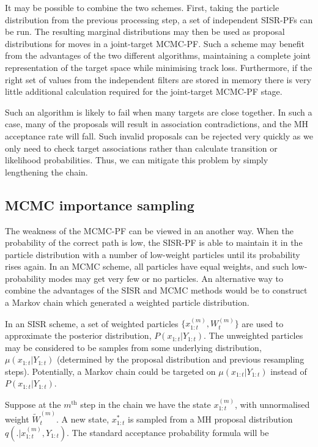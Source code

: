 It may be possible to combine the two schemes. First, taking the particle distribution from the previous processing step, a set of independent SISR-PFs can be run. The resulting marginal distributions may then be used as proposal distributions for moves in a joint-target MCMC-PF. Such a scheme may benefit from the advantages of the two different algorithms, maintaining a complete joint representation of the target space while minimising track loss. Furthermore, if the right set of values from the independent filters are stored in memory there is very little additional calculation required for the joint-target MCMC-PF stage.

Such an algorithm is likely to fail when many targets are close together. In such a case, many of the proposals will result in association contradictions, and the MH acceptance rate will fall. Such invalid proposals can be rejected very quickly as we only need to check target associations rather than calculate transition or likelihood probabilities. Thus, we can mitigate this problem by simply lengthening the chain.



\subsection{MCMC importance sampling}
The weakness of the MCMC-PF can be viewed in an another way. When the probability of the correct path is low, the SISR-PF is able to maintain it in the particle distribution with a number of low-weight particles until its probability rises again. In an MCMC scheme, all particles have equal weights, and such low-probability modes may get very few or no particles. An alternative way to combine the advantages of the SISR and MCMC methods would be to construct a Markov chain which generated a weighted particle distribution.

In an SISR scheme, a set of weighted particles $\{ x_{1:t}^{(m)}, W_t^{(m)} \}$ are used to approximate the posterior distribution, $P(x_{1:t}|Y_{1:t})$. The unweighted particles may be considered to be samples from some underlying distribution, $\mu(x_{1:t}|Y_{1:t})$ (determined by the proposal distribution and previous resampling steps). Potentially, a Markov chain could be targeted on $\mu(x_{1:t}|Y_{1:t})$ instead of $P(x_{1:t}|Y_{1:t})$.

Suppose at the $m^{\text{th}}$ step in the chain we have the state $x_{1:t}^{(m)}$, with unnormalised weight $\tilde{W}_t^{(m)}$. A new state, $x_{1:t}^{*}$ is sampled from a MH proposal distribution $q(.|x_{1:t}^{(m)}, Y_{1:t})$. The standard acceptance probability formula will be

